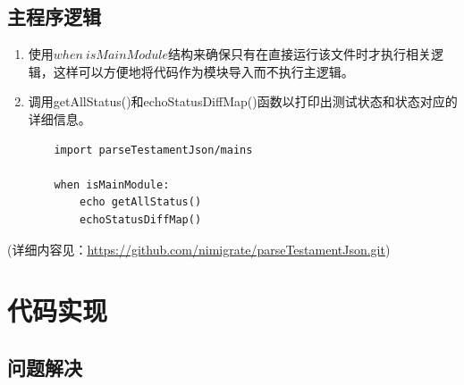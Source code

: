 \documentclass[UTF8]{ctexart}
\begin{document}
	\subsection{主程序逻辑} %
	\begin{enumerate}[leftmargin=3.5em]
		\item 使用$ when\:isMainModule $结构来确保只有在直接运行该文件时才执行相关逻辑，这样可以方便地将代码作为模块导入而不执行主逻辑。
		\item 调用getAllStatus()和echoStatusDiffMap()函数以打印出测试状态和状态对应的详细信息。
		\begin{tcolorbox}[colback=gray!20, colframe=gray!20, rounded corners, boxrule=-5pt, height=0.11\textheight, width=0.4\textwidth, left=0pt, right=0pt, top=0pt, bottom=0pt]
			\begin{verbatim}
	import parseTestamentJson/mains

	when isMainModule:
  		echo getAllStatus()
  		echoStatusDiffMap()
			\end{verbatim}
		\end{tcolorbox}
	\end{enumerate}
	\hspace*{2em}(详细内容见：{\underline{\url{https://github.com/nimigrate/parseTestamentJson.git}}})

\section{代码实现} %
	\subsection{问题解决} %
\end{document}
